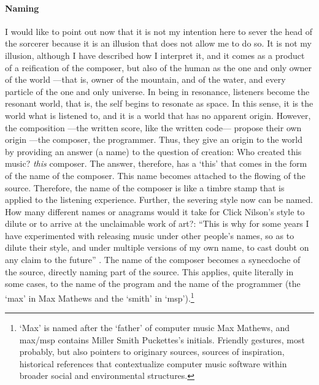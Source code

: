 \paragraph{Naming}
I would like to point out now that it is not my intention here to sever the head of the sorcerer because it is an illusion that does not allow me to do so. It is not my illusion, although I have described how I interpret it, and it comes as a product of a reification of the composer, but also of the human as the one and only owner of the world ---that is, owner of the mountain, and of the water, and every particle of the one and only universe. In being in resonance, listeners become the resonant world, that is, the self begins to resonate as space. In this sense, it is the world what is listened to, and it is a world that has no apparent origin. However, the composition ---the written score, like the written code--- propose their own origin ---the composer, the programmer. Thus, they give an origin to the world by providing an answer (a name) to the question of creation: Who created this music? \textit{this} composer. The answer, therefore, has a `this' that comes in the form of the name of the composer. This name becomes attached to the flowing of the source. Therefore, the name of the composer is like a timbre stamp that is applied to the listening experience. Further, the severing style now can be named. How many different names or anagrams would it take for Click Nilson's style to dilute or to arrive at the unclaimable work of art?: ``This is why for some years I have experimented with releasing music under other people's names, so as to dilute their style, and under multiple versions of my own name, to cast doubt on any claim to the future'' \parencite{Col15:Col}. The name of the composer becomes a synecdoche of the source, directly naming part of the source. This applies, quite literally in some cases, to the name of the program and the name of the programmer (the `max' in Max Mathews and the `smith' in `msp').\footnote{`Max' is named after the `father' of computer music Max Mathews, and \gls{max/msp} contains Miller Smith Puckettes's initials. Friendly gestures, most probably, but also pointers to originary sources, sources of inspiration, historical references that contextualize computer music software within broader social and environmental structures.}

